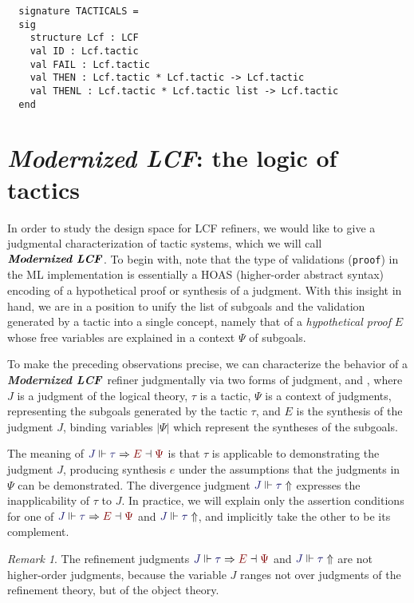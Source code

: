\documentclass[11pt]{article}
\theoremstyle{definition}
\theoremstyle{remark}
\newtheorem{remark}[thm]{Remark}
\numberwithin{equation}{section}
\def\InputModeColorName{MidnightBlue}
\def\OutputModeColorName{Maroon}
\newcommand\InputMode[1]{{\color{\InputModeColorName}{#1}}}
\newcommand\OutputMode[1]{{\color{\OutputModeColorName}{#1}}}
\newcommand\JJ{J}
\newcommand\Refine[4]{\InputMode{#1}\Vdash\InputMode{#2}\Rightarrow\OutputMode{#4}\dashv\OutputMode{#3}}
\newcommand\NoRefine[2]{\InputMode{#1}\Vdash\InputMode{#2}\Uparrow}
\newcommand\Dom[1]{\left\vert#1\right\vert}
\newcommand\ModLCF{\textbf{\emph{Modernized LCF}}}
\begin{document}
\begin{lstlisting}
  signature TACTICALS =
  sig
    structure Lcf : LCF
    val ID : Lcf.tactic
    val FAIL : Lcf.tactic
    val THEN : Lcf.tactic * Lcf.tactic -> Lcf.tactic
    val THENL : Lcf.tactic * Lcf.tactic list -> Lcf.tactic
  end
\end{lstlisting}

\section{\ModLCF: the logic of tactics}

In order to study the design space for LCF refiners, we would like to give a
judgmental characterization of tactic systems, which we will call $\ModLCF$.
To begin with, note that the type of validations (\verb!proof!) in the ML
implementation is essentially a HOAS (higher-order abstract syntax) encoding
of a hypothetical proof or synthesis of a judgment.  With this insight in hand,
we are in a position to unify the list of subgoals and the validation generated
by a tactic into a single concept, namely that of a \emph{hypothetical proof}
$E$ whose free variables are explained in a context $\Psi$ of subgoals.

To make the preceding observations precise, we can characterize the behavior of
a \ModLCF\ refiner judgmentally via two forms of judgment,
\framebox{$\Refine{\JJ}{\tau}{\Psi}{E}$} and \framebox{$\NoRefine{\JJ}{\tau}$}, where $\JJ$ is a judgment of the
logical theory, $\tau$ is a tactic, $\Psi$ is a context of judgments,
representing the subgoals generated by the tactic $\tau$, and $E$ is the
synthesis of the judgment $\JJ$, binding variables $\Dom{\Psi}$ which represent
the syntheses of the subgoals.

The meaning of $\Refine{\JJ}{\tau}{\Psi}{E}$ is that $\tau$ is applicable to
demonstrating the judgment $\JJ$, producing synthesis $e$ under the assumptions
that the judgments in $\Psi$ can be demonstrated. The divergence judgment
$\NoRefine{\JJ}{\tau}$ expresses the inapplicability of $\tau$ to $\JJ$.  In
practice, we will explain only the assertion conditions for one of
$\Refine{\JJ}{\tau}{\Psi}{E}$ and $\NoRefine{\JJ}{\tau}$, and implicitly take
the other to be its complement.

\begin{remark}
  The refinement judgments $\Refine{\JJ}{\tau}{\Psi}{E}$ and
  $\NoRefine{\JJ}{\tau}$ are not higher-order judgments, because the variable
  $\JJ$ ranges not over judgments of the refinement theory, but of the
  object theory.
\end{remark}
\end{document}
